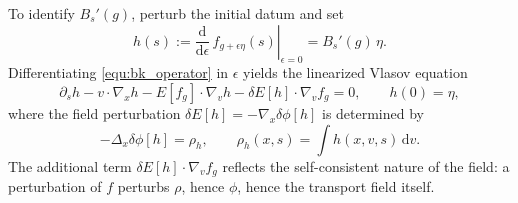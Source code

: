 \documentclass{article}
\theoremstyle{definition}
\begin{document}
To identify $B_s'(g)$, perturb the initial datum and set
\begin{equation}
    h(s) := \left.\frac{\mathrm{d}}{\mathrm{d}\epsilon}\, f_{g+\epsilon\eta}(s)\right|_{\epsilon=0} 
    = B_s'(g)\,\eta.
\end{equation}
Differentiating \eqref{equ:bk_operator} in $\epsilon$ yields the linearized Vlasov equation
\begin{equation}
    \partial_s h - v\cdot\nabla_x h - E[f_g]\cdot\nabla_v h - \delta E[h]\cdot\nabla_v f_g = 0, 
    \qquad 
    h(0) = \eta,
\end{equation}
where the field perturbation $\delta E[h] = -\nabla_x\delta\phi[h]$ is determined by
\begin{equation}
    -\Delta_x\delta\phi[h] = \rho_h, 
    \qquad 
    \rho_h(x,s) = \int h(x,v,s)\,\mathrm{d} v.
\end{equation}
The additional term $\delta E[h]\cdot\nabla_v f_g$ reflects the self-consistent nature of the field: a perturbation of $f$ perturbs $\rho$, hence $\phi$, hence the transport field itself.

  

\appendix
\end{document}
